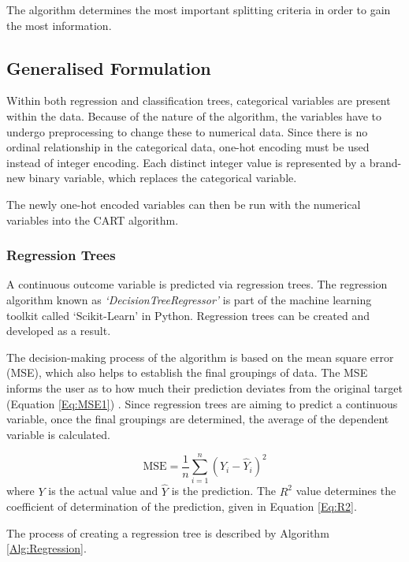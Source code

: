 \documentclass[../thesis.tex]{subfiles}
\begin{document}
The algorithm determines the most important splitting criteria in order to gain the most information.


\subsection{Generalised Formulation}
Within both regression and classification trees, categorical variables are present within the data. Because of the nature of the algorithm, the variables have to undergo preprocessing to change these to numerical data. Since there is no ordinal relationship in the categorical data, one-hot encoding must be used instead of integer encoding. Each distinct integer value is represented by a brand-new binary variable, which replaces the categorical variable.

The newly one-hot encoded variables can then be run with the numerical variables into the CART algorithm. 

\subsubsection{Regression Trees}
A continuous outcome variable is predicted via regression trees. The regression algorithm known as \textit{`DecisionTreeRegressor'} is part of the machine learning toolkit called `Scikit-Learn' \cite{Pedregosa2011} in Python. Regression trees can be created and developed as a result.

The decision-making process of the algorithm is based on the mean square error (MSE), which also helps to establish the final groupings of data. The MSE informs the user as to how much their prediction deviates from the original target (Equation \eqref{Eq:MSE1}) \cite{Karunasingha2022}. Since regression trees are aiming to predict a continuous variable, once the final groupings are determined, the average of the dependent variable is calculated.

\begin{equation}\label{Eq:MSE1}
    \text{MSE} = \frac{1}{n}\sum^{n}_{i=1}(Y_{i} - \hat{Y}_{i})^2
\end{equation}
where $Y$ is the actual value and $\hat{Y}$ is the prediction.
The $R^{2}$ value determines the coefficient of determination of the prediction, given in Equation \eqref{Eq:R2}.

The process of creating a regression tree is described by Algorithm \ref{Alg:Regression}.
\end{document}
